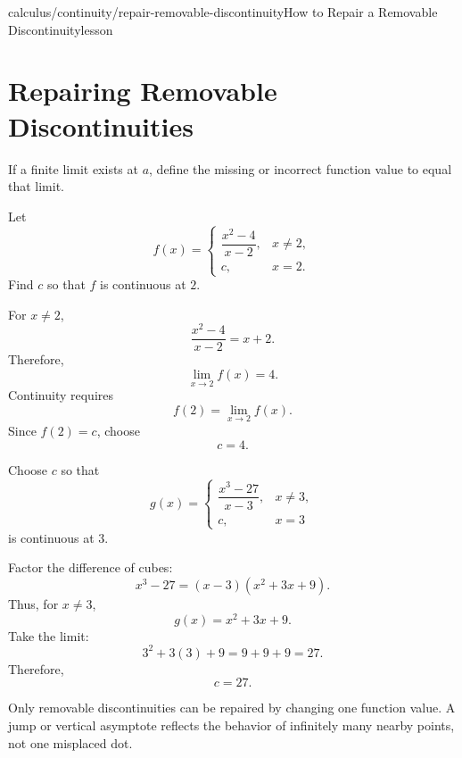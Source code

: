 \begin{webpage}{calculus/continuity/repair-removable-discontinuity}{How to Repair a Removable Discontinuity}{lesson}
\section{Repairing Removable Discontinuities}


If a finite limit exists at \(a\), define the missing or incorrect function value to equal that limit.

\begin{bgguided}[title={Fill the hole with the approached value}]
Let
\[
  f(x)=
  \begin{cases}
    \dfrac{x^2-4}{x-2},&x\ne2,\\
    c,&x=2.
  \end{cases}
\]
Find \(c\) so that \(f\) is continuous at \(2\).

\begin{bgsolution}
For \(x\ne2\),
\[
  \frac{x^2-4}{x-2}=x+2.
\]
Therefore,
\[
  \lim_{x\to2}f(x)=4.
\]
Continuity requires
\[
  f(2)=\lim_{x\to2}f(x).
\]
Since \(f(2)=c\), choose
\[
  \boxed{c=4}.
\]
\end{bgsolution}
\end{bgguided}



\begin{bgexample}[title={Repair a more complicated hole}]
Choose \(c\) so that
\[
  g(x)=
  \begin{cases}
    \dfrac{x^3-27}{x-3},&x\ne3,\\
    c,&x=3
  \end{cases}
\]
is continuous at \(3\).

\begin{bgsolution}
Factor the difference of cubes:
\[
  x^3-27=(x-3)(x^2+3x+9).
\]
Thus, for \(x\ne3\),
\[
  g(x)=x^2+3x+9.
\]
Take the limit:
\[
  3^2+3(3)+9=9+9+9=27.
\]
Therefore,
\[
  \boxed{c=27}.
\]
\end{bgsolution}
\end{bgexample}

\begin{bgmistake}
Only removable discontinuities can be repaired by changing one function value. A jump or vertical asymptote reflects the behavior of infinitely many nearby points, not one misplaced dot.
\end{bgmistake}
\end{webpage}

